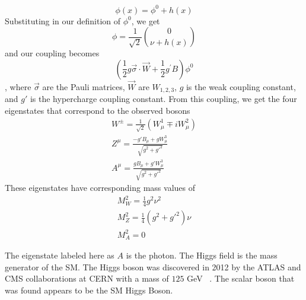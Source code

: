 		\begin{equation}\label{eqn:phi-h} \phi(x) = \phi^0 + h(x) \end{equation}
		Substituting in our definition of $\phi^0$, we get
		\begin{equation}\label{eqn:phi-h-vec} \phi = \frac{1}{\sqrt{2}} \binom{0}{\nu+h(x)} \end{equation}
		and our coupling becomes 
		\begin{equation}\label{eqn:coupling} (\frac{1}{2} g \vec{\sigma} \cdot \vec{W} + \frac{1}{2} g^\prime B ) \phi^0  \end{equation}, where $\vec{\sigma}$ are the Pauli matrices, $\vec{W}$ are $W_{1,2,3}$, $g$ is the weak coupling constant, and $g\prime$ is the hypercharge coupling constant. From this coupling, we get the four eigenstates that correspond to the observed bosons
		\begin{equation}\label{eqn:mass-eigenstates} \begin{split}
		W^\pm = \frac{1}{\sqrt{2}} ( W^1_\mu \mp i W^2_\mu ) \\
		Z^\mu = \frac{ - g\prime B_\mu + g W^3_\mu }{ \sqrt{g^2+g\prime^2} } \\
		A^\mu = \frac{ g B_\mu + g\prime W^3_\mu }{ \sqrt{g^2+g\prime^2} }
		\end{split}
		\end{equation}
		These eigenstates have corresponding mass values of 
		\begin{equation}\label{eqn:mass-eigenstates-masses} \begin{split}
		M^2_W = \frac{1}{4}g^2\nu^2 \\
		M^2_Z = \frac{1}{4}(g^2+g\prime^2)\nu \\
		M^2_A = 0
		\end{split}
		\end{equation}

		The eigenstate labeled here as $A$ is the photon. The Higgs field is the mass generator of the SM. The Higgs boson was discovered in 2012 by the ATLAS and CMS collaborations at CERN with a mass of $125$ GeV ~\cite{higgs-discovery-atlas}. The scalar boson that was found appears to be the SM Higgs Boson. 

